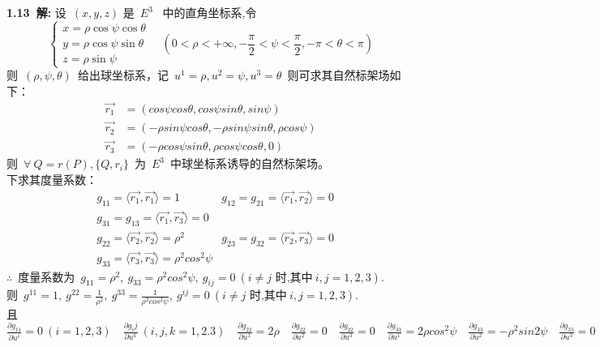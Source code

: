 \noindent
\\
\\
{\textbf{1.13\ 解:}} 设\ $(x,y,z)$ 是\ $E^3$ \ 中的直角坐标系,令
$$
\left\lbrace 
           \begin{array}{l}
           x=\rho \cos\psi\cos \theta
           \\
           y=\rho \cos\psi\sin \theta
           \\
           z=\rho \sin\psi
           \end{array}
\right. \quad(0<\rho <+\infty,-\frac{\pi}{2}<\psi<\frac{\pi}{2},-\pi<\theta<\pi )
$$
则\ $(\rho,\psi,\theta)$\ 给出球坐标系，记\ $u^1=\rho ,u^2=\psi ,u^3=\theta $\ 则可求其自然标架场如下：
\begin{align*}
\overrightarrow{r_1}&=(cos\psi cos\theta ,cos \psi sin \theta ,sin\psi )
\\
\overrightarrow{r_2}&=(-\rho sin \psi cos\theta ,-\rho sin\psi sin\theta ,\rho cos\psi )
\\
\overrightarrow{r_3}&=(-\rho cos\psi sin\theta ,\rho cos\psi cos\theta ,0)
\end{align*}
则\ $\forall \ Q=r(P),\{Q,r_i\}$\ 为\ $E^3$\ 中球坐标系诱导的自然标架场。
\\
下求其度量系数：
\begin{align*}
&g_{11}=\langle \overrightarrow{r_1},\overrightarrow{r_1} \rangle=1  & g_{12}=g_{21}=\langle \overrightarrow{r_1},\overrightarrow{r_2} \rangle =0     
\\
&g_{31}=g_{13}=\langle \overrightarrow{r_1},\overrightarrow{r_3} \rangle=0 
\\
&g_{22}=\langle \overrightarrow{r_2},\overrightarrow{r_2} \rangle=\rho ^2  & g_{23}=g_{32}=\langle \overrightarrow{r_2},\overrightarrow{r_3} \rangle =0     
\\
&g_{33}=\langle \overrightarrow{r_3},\overrightarrow{r_3} \rangle=\rho ^2cos^2\psi  
\end{align*}
$\therefore$\ 度量系数为\ $g_{11}=\rho^2,\ g_{33}=\rho^2cos^2\psi, \ g_{ij}=0\ (i\neq j\text{\ 时,其中}\ i,j=1,2,3).$
\\
则\ $g^{11}=1,\ g^{22}=\frac{1}{\rho^2},\ g^{33}=\frac{1}{\rho^2cos^2\psi },\  g^{ij}=0\ (i\neq j\text{\ 时,其中}\ i,j=1,2,3)$.
\\
且\ $\frac{\partial g_{11}}{\partial u^i}=0\ (i=1,2,3)\quad \frac{\partial g_ij}{\partial u^k}\ (i,j,k=1,2.3)\quad \frac{\partial g_{22}}{\partial u^1}=2\rho \quad \frac{\partial g_{22}}{\partial u^2}=0 \quad\frac{\partial g_{22}}{\partial u^3}=0 \quad\frac{\partial g_{33}}{\partial u^1}=2\rho cos^2\psi  \quad \frac{\partial g_{33}}{\partial u^2}=-\rho^2 sin2\psi  \quad\frac{\partial g_{33}}{\partial u^3}=0$
